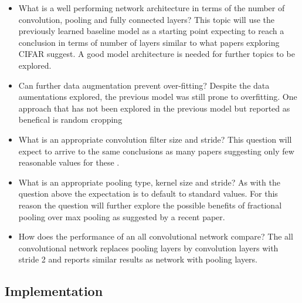 \documentclass[12pt]{article}
\begin{document}
\begin{itemize}
\item What is a well performing network architecture in terms of the number of convolution, pooling and fully connected layers? This topic will use the previously learned baseline model as a starting point expecting to reach a conclusion in terms of number of layers similar to what papers exploring CIFAR suggest\cite{inspiration}. A good model architecture is needed for further topics to be explored.
\item Can further data augmentation prevent over-fitting? Despite the data aumentations explored, the previous model was still prone to overfitting. One approach that has not been explored in the previous model but reported as benefical is random cropping\cite{kernel}\cite{crop}
\item What is an appropriate convolution filter size and stride? This question will expect to arrive to the same conclusions as many papers suggesting only few reasonable values for these \cite{inspiration}\cite{bestprac}\cite{frac}.
\item What is an appropriate pooling type, kernel size and stride? As with the question above the expectation is to default to standard values. For this reason the question will further explore the possible benefits of fractional pooling  over max pooling as suggested by a recent paper\cite{frac}.
\item How does the performance of an all convolutional network\cite{allconv} compare? The all convolutional network replaces pooling layers by convolution layers with stride 2 and reports similar results as network with pooling layers. 
\end{itemize}

\subsection*{Implementation}
\end{document}
